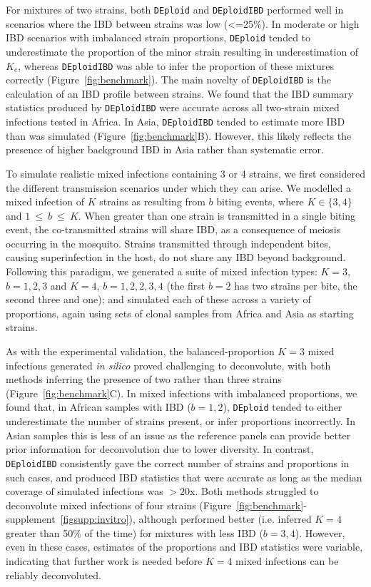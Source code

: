 \documentclass[9pt,lineno]{elife}
\begin{document}
For mixtures of two strains, both \texttt{DEploid} and \texttt{DEploidIBD} performed well in scenarios where the IBD between strains was low (<=25\%). In moderate or high IBD scenarios with imbalanced strain proportions, \texttt{DEploid} tended to underestimate the proportion of the minor strain resulting in underestimation of $K_e$, whereas \texttt{DEploidIBD} was able to infer the proportion of these mixtures correctly (Figure~\ref{fig:benchmark}).  The main novelty of \texttt{DEploidIBD} is the calculation of an IBD profile between strains. We found that the IBD summary statistics produced by \texttt{DEploidIBD} were accurate across all two-strain mixed infections tested in Africa. In Asia, \texttt{DEploidIBD} tended to estimate more IBD than was simulated (Figure~\ref{fig:benchmark}B). However, this likely reflects the presence of higher background IBD in Asia rather than systematic error.

To simulate realistic mixed infections containing 3 or 4 strains, we first considered the different transmission scenarios under which they can arise.  We modelled a mixed infection of $K$ strains as resulting from $b$ biting events, where $K \in \{3,4\}$ and $1~{\leq}~{b}~{\leq}~K$. When greater than one strain is transmitted in a single biting event, the co-transmitted strains will share IBD, as a consequence of meiosis occurring in the mosquito. Strains transmitted through independent bites, causing superinfection in the host, do not share any IBD beyond background. Following this paradigm, we generated a suite of mixed infection types: $K=3$, $b=1, 2, 3$ and $K=4$, $b=1, 2, 2, 3, 4$ (the first $b=2$ has two strains per bite, the second three and one); and simulated each of these across a variety of proportions, again using sets of clonal samples from Africa and Asia as starting strains.

As with the experimental validation, the balanced-proportion $K=3$ mixed infections generated {\it in silico} proved challenging to deconvolute, with both methods inferring the presence of two rather than three strains (Figure~\ref{fig:benchmark}C). In mixed infections with imbalanced proportions, we found that, in African samples with IBD ($b=1, 2$), \texttt{DEploid} tended to either underestimate the number of strains present, or infer proportions incorrectly. In Asian samples this is less of an issue as the reference panels can provide better prior information for deconvolution due to lower diversity. In contrast, \texttt{DEploidIBD} consistently gave the correct number of strains and proportions in such cases, and produced IBD statistics that were accurate as long as the median coverage of  simulated infections was $>20$x. Both methods struggled to deconvolute mixed infections of four strains (Figure~\ref*{fig:benchmark}-supplement~\ref*{figsupp:invitro}), although performed better (i.e. inferred $K=4$ greater than 50\% of the time) for mixtures with less IBD ($b=3, 4$). However, even in these cases, estimates of the proportions and IBD statistics were variable, indicating that further work is needed before $K=4$ mixed infections can be reliably deconvoluted.
\end{document}
